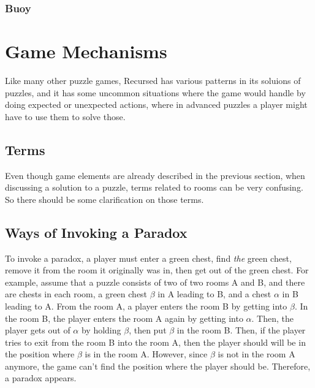 \documentclass[a4paper]{article}
\theoremstyle{definition}
\begin{document}
\subsubsection{Buoy}

\section{Game Mechanisms}
Like many other puzzle games, Recursed has various patterns in its soluions of puzzles, and it has some uncommon situations
where the game would handle by doing expected or unexpected actions, where in advanced puzzles a player might have to use them to solve those.

\subsection{Terms}
Even though game elements are already described in the previous section, when discussing a solution to a puzzle, terms related to rooms can be very confusing.
So there should be some clarification on those terms.

\subsection{Ways of Invoking a Paradox}
\label{s:invoke-paradox}
To invoke a paradox, a player must enter a green chest, find \emph{the} green chest, remove it from the room it originally was in,
then get out of the green chest.
For example, assume that a puzzle consists of two of two rooms A and B, and there are chests in each room, a green chest $\beta$ in A leading to B,
and a chest $\alpha$ in B leading to A. From the room A, a player enters the room B by getting into $\beta$. In the room B, the player
enters the room A again by getting into $\alpha$. Then, the player gets out of $\alpha$ by holding $\beta$, then put $\beta$ in the room B.
Then, if the player tries to exit from the room B into the room A, then the player should will be in the position where $\beta$ is in the room A.
However, since $\beta$ is not in the room A anymore, the game can't find the position where the player should be. Therefore, a paradox appears.
\end{document}
